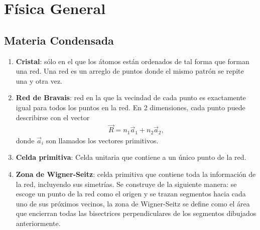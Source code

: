 \chapter{Física General}
\section{Materia Condensada}
\begin{enumerate}
	\item \textbf{Cristal}: sólo en el que los átomos están ordenados 
	de tal forma que forman una red. Una red es un arreglo de puntos
	donde el mismo patrón se repite una y otra vez. 
	
	\item \textbf{Red de Bravais}: red en la que la vecindad de cada punto 
	es exactamente igual para todos los puntos en la red. En 2 dimensiones, 
	cada punto puede describirse con el vector 
	\begin{align}
		\vec{R}=n_1\vec{a}_1+n_2\vec{a}_2,
	\end{align}
	donde $\vec{a}_i$ son llamados los vectores primitivos.
	
	\item \textbf{Celda primitiva}: Celda unitaria que contiene a un único 
	punto de la red.
	
	\item \textbf{Zona de Wigner-Seitz}: celda primitiva que contiene toda 
	la información de la red, incluyendo sus simetrías. Se construye de la siguiente
	manera: se escoge un punto de la red como el origen y se trazan segmentos
	hacia cada uno de sus próximos vecinos, la zona de Wigner-Seitz se define 
	como el área que encierran todas las bisectrices perpendiculares de los 
	segmentos dibujados anteriormente. 
\end{enumerate}